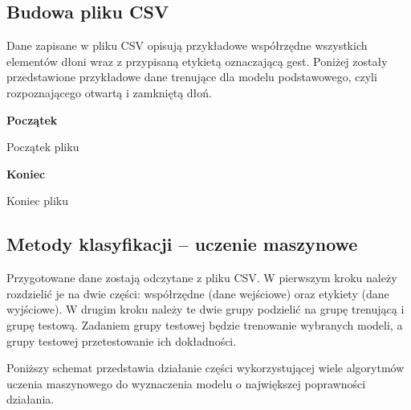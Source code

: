 \subsection{Budowa pliku CSV}
\quad Dane zapisane w pliku CSV opisują przykładowe współrzędne wszystkich elementów dłoni wraz z przypisaną etykietą oznaczającą gest. Poniżej zostały przedstawione przykładowe dane trenujące dla modelu podstawowego, czyli rozpoznającego otwartą i zamkniętą dłoń. \newline

\textbf{Początek}\newline

\begin{table}[H]
\centering
{} 
\caption{Początek pliku}
\end{table}

\textbf{Koniec}\newline

\begin{table}[H]
\centering
{} 
\caption{Koniec pliku}
\end{table}

\newpage
\subsection{Metody klasyfikacji -- uczenie maszynowe}

\quad Przygotowane dane zostają odczytane z pliku CSV. W pierwszym kroku należy rozdzielić je na dwie części: współrzędne (dane wejściowe) oraz etykiety (dane wyjściowe). W drugim kroku należy te dwie grupy podzielić na grupę trenującą i grupę testową. Zadaniem grupy testowej będzie trenowanie wybranych modeli, a grupy testowej przetestowanie ich dokładności. 

\quad Poniższy schemat przedstawia działanie części wykorzystującej wiele algorytmów uczenia maszynowego do wyznaczenia modelu o największej poprawności działania. 

